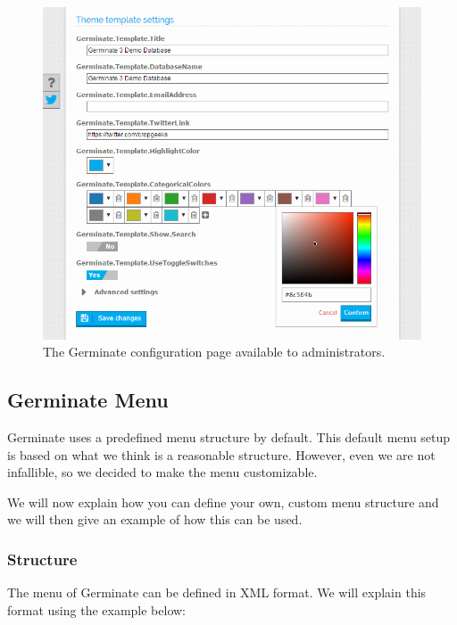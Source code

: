 \begin{figure}
	\centering
	\includegraphics[scale=0.4]{img/configuration/admin-config.png}
	\caption{The Germinate configuration page available to administrators.}
	\label{fig:admin-config}
\end{figure}

\subsection{Germinate Menu}
\label{sec:menu}
Germinate uses a predefined menu structure by default. This default menu setup is based on what we think is a reasonable structure. However, even we are not infallible, so we decided to make the menu customizable.

We will now explain how you can define your own, custom menu structure and we will then give an example of how this can be used.

\subsubsection{Structure}
The menu of Germinate can be defined in XML format. We will explain this format using the example below:

